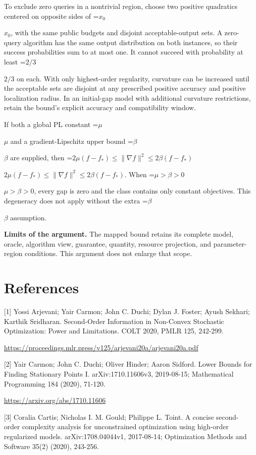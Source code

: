 \documentclass[10pt,a4paper]{article}
\newcommand{\AtlasMath}[1]{\par\begingroup\centering\setbox0=\hbox{$\displaystyle #1$}\ifdim\wd0>1.4\linewidth\typeout{ATLAS WIDE FORMULA: \the\wd0}\fi\ifdim\wd0>\linewidth\resizebox{\linewidth}{!}{\box0}\else\box0\fi\par\endgroup}
\newcommand{\AtlasInlineMath}[1]{\begingroup\setbox0=\hbox{$#1$}\ifdim\wd0>.4\linewidth\endgroup\AtlasMath{#1}\else\endgroup$#1$\fi}
\begin{document}
To exclude zero queries in a nontrivial region, choose two positive quadratics centered on opposite sides of \AtlasInlineMath{x_0}, with the same public budgets and disjoint acceptable-output sets. A zero-query algorithm has the same output distribution on both instances, so their success probabilities sum to at most one. It cannot succeed with probability at least \AtlasInlineMath{2/3} on each. With only highest-order regularity, curvature can be increased until the acceptable sets are disjoint at any prescribed positive accuracy and positive localization radius. In an initial-gap model with additional curvature restrictions, retain the bound's explicit accuracy and compatibility window.

If both a global PL constant \AtlasInlineMath{\mu} and a gradient-Lipschitz upper bound \AtlasInlineMath{\beta} are supplied, then \AtlasInlineMath{2\mu(f-f_*)\le\|\nabla f\|^2\le2\beta(f-f_*)}. When \AtlasInlineMath{\mu>\beta>0}, every gap is zero and the class contains only constant objectives. This degeneracy does not apply without the extra \AtlasInlineMath{\beta} assumption.

\textbf{Limits of the argument.} The mapped bound retains its complete model, oracle, algorithm view, guarantee, quantity, resource projection, and parameter-region conditions. This argument does not enlarge that scope.

\section{References}
[1] Yossi Arjevani; Yair Carmon; John C. Duchi; Dylan J. Foster; Ayush Sekhari; Karthik Sridharan. Second-Order Information in Non-Convex Stochastic Optimization: Power and Limitations. COLT 2020, PMLR 125, 242-299.

\url{https://proceedings.mlr.press/v125/arjevani20a/arjevani20a.pdf}

[2] Yair Carmon; John C. Duchi; Oliver Hinder; Aaron Sidford. Lower Bounds for Finding Stationary Points I. arXiv:1710.11606v3, 2019-08-15; Mathematical Programming 184 (2020), 71-120.

\url{https://arxiv.org/abs/1710.11606}

[3] Coralia Cartis; Nicholas I. M. Gould; Philippe L. Toint. A concise second-order complexity analysis for unconstrained optimization using high-order regularized models. arXiv:1708.04044v1, 2017-08-14; Optimization Methods and Software 35(2) (2020), 243-256.
\end{document}
